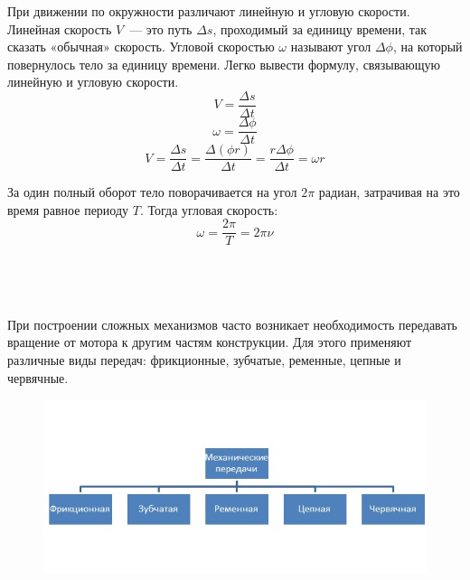 При движении по окружности различают линейную и угловую скорости. Линейная скорость \(V\)~--- это путь \(\Delta s\), проходимый за единицу времени, так сказать «обычная» скорость. Угловой скоростью \(\omega\) называют угол \(\Delta\phi\), на который повернулось тело за единицу времени. Легко вывести формулу, связывающую линейную и угловую скорости.
\begin{equation}
V=\frac{\Delta s}{\Delta t}
\end{equation}
\begin{equation}
\omega=\frac{\Delta\phi}{\Delta t}
\end{equation} 
\begin{equation}
V=\frac{\Delta s}{\Delta t}=\frac{\Delta (\phi r)}{\Delta t}=\frac{r\Delta\phi}{\Delta t}=\omega r
\end{equation} 

За один полный оборот тело поворачивается на угол \(2\pi\) радиан, затрачивая на это время равное периоду \(T\). Тогда угловая скорость:
\begin{equation}
\omega=\frac{2\pi}{T}=2\pi\nu
\end{equation}\\\\

{\hypertarget{lesson5x3}{}}\\\\

При построении сложных механизмов часто возникает необходимость передавать вращение от мотора к другим частям конструкции. Для этого применяют различные виды передач: фрикционные, зубчатые, ременные, цепные и червячные.
\begin{figure}[h!]
	\begin{center}
		\includegraphics[width=0.9\linewidth]{chapters/chapter5/images/2}
		\caption{}
		\label{ris:image5x1}
	\end{center}
\end{figure}

